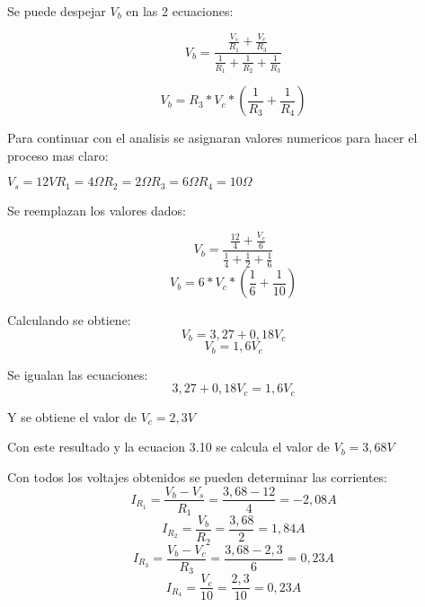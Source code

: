 \begin{example}
Se puede despejar $V_b$ en las 2 ecuaciones:

\begin {equation*}
    V_b =\frac{\frac{V_s}{R_1}+\frac{V_c}{R_3}}{\frac{1}{R_1}+\frac{1}{R_2}+\frac{1}{R_3}}
\end {equation*}

\begin {equation*}
    V_b=R_3*V_c*(\frac{1}{R_3}+\frac{1}{R_4})
\end {equation*}

Para continuar con el analisis se asignaran valores numericos para hacer el proceso mas claro:

\hspace{2 cm}$V_s=12 V$\hspace{1 cm}$R_1=4\Omega$\hspace{1 cm}$R_2=2 \Omega$\hspace{1 cm}$R_3=6 \Omega$\hspace{1 cm}$R_4=10 \Omega$

Se reemplazan los valores dados:

\begin {equation*}
    V_b=\frac{\frac{12}{4}+\frac{V_c}{6}}{\frac{1}{4}+\frac{1}{2}+\frac{1}{6}}
\end {equation*}
\begin {equation*}
    V_b=6*V_c*(\frac{1}{6}+\frac{1}{10})
\end {equation*}

Calculando se obtiene:
\begin {equation*}
    V_b=3,27 +0,18V_c
\end {equation*}
\begin {equation*}
    V_b=1,6V_c
\end {equation*}

Se igualan las ecuaciones:
\begin {equation*}
    3,27+0,18V_c=1,6V_c
\end {equation*}

Y se obtiene el valor de $V_c=2,3V$

Con este resultado y la ecuacion 3.10 se calcula el valor de $V_b=3,68V$

Con todos los voltajes obtenidos se pueden determinar las corrientes:
\begin {equation*}
    I_{R_1}=\frac{V_b-V_s}{R_1}=\frac{3,68-12}{4}=-2,08 A
\end {equation*}
\begin {equation*}
    I_{R_2}=\frac{V_b}{R_2}=\frac{3,68}{2}= 1,84 A
\end {equation*}
\begin {equation*}
    I_{R_3}=\frac{V_b-V_c}{R_3}=\frac{3,68-2,3}{6}=0,23 A
\end {equation*}
\begin {equation*}
    I_{R_4}=\frac{V_c}{10}=\frac{2,3}{10}=0,23 A 
\end {equation*}

\end{example}

